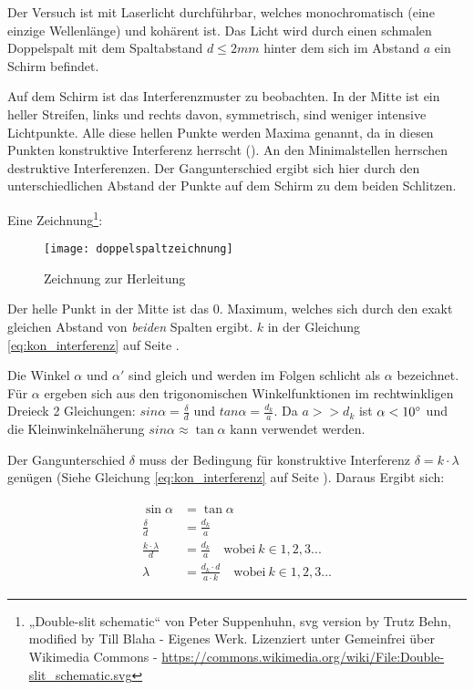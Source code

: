 Der Versuch ist mit Laserlicht durchführbar, welches monochromatisch (eine einzige Wellenlänge) und kohärent ist. Das Licht wird durch einen schmalen Doppelspalt mit dem Spaltabstand $d \leq 2mm$ hinter dem sich im Abstand $a$ ein Schirm befindet. 
	
Auf dem Schirm ist das Interferenzmuster zu beobachten. In der Mitte ist ein heller Streifen, links und rechts davon, symmetrisch, sind weniger intensive Lichtpunkte. Alle diese hellen Punkte werden Maxima genannt, da in diesen Punkten konstruktive Interferenz herrscht (). An den Minimalstellen herrschen destruktive Interferenzen. Der Gangunterschied ergibt sich hier durch den unterschiedlichen Abstand der Punkte auf dem Schirm zu dem beiden Schlitzen.

Eine Zeichnung\footnote{„Double-slit schematic“ von Peter Suppenhuhn, svg version by Trutz Behn, modified by Till Blaha - Eigenes Werk. Lizenziert unter Gemeinfrei über Wikimedia Commons - \url{https://commons.wikimedia.org/wiki/File:Double-slit_schematic.svg}}:

\begin{figure}[h!]
		\centering
		\texttt{[image: doppelspaltzeichnung]}
		\caption{Zeichnung zur Herleitung}
\end{figure}

Der helle Punkt in der Mitte ist das 0. Maximum, welches sich durch den exakt gleichen Abstand von \emph{beiden} Spalten ergibt. $k$ in der Gleichung \ref{eq:kon_interferenz} auf Seite \pageref{eq:kon_interferenz}.
	
Die Winkel $\alpha$ und $\alpha '$ sind gleich und werden im Folgen schlicht als $\alpha$ bezeichnet. Für $\alpha$ ergeben sich aus den trigonomischen Winkelfunktionen im rechtwinkligen Dreieck 2 Gleichungen: $sin{\alpha}=\frac{\delta}{d}$ und $tan{\alpha}=\frac{d_k}{a}$. Da $a>>d_k$ ist $\alpha<10 \degree$ und die Kleinwinkelnäherung $sin{\alpha} \approx \tan{\alpha}$ kann verwendet werden.

Der Gangunterschied $\delta$ muss der Bedingung für konstruktive Interferenz $\delta = k \cdot \lambda$ genügen (Siehe Gleichung \ref{eq:kon_interferenz} auf Seite \pageref{eq:kon_interferenz}). Daraus Ergibt sich:
	
\begin{align}
\begin{split}
	\sin{\alpha} &= \tan{\alpha} \\
	\frac{\delta}{d} &= \frac{d_k}{a} \\
	\frac{k \cdot \lambda}{d} &= \frac{d_k}{a} \quad \text{wobei} \ k \in 1,2,3... \\
	\lambda &= \frac{d_{k} \cdot d}{a \cdot k} \quad \text{wobei} \ k \in 1,2,3...
\end{split}
\end{align}
	

